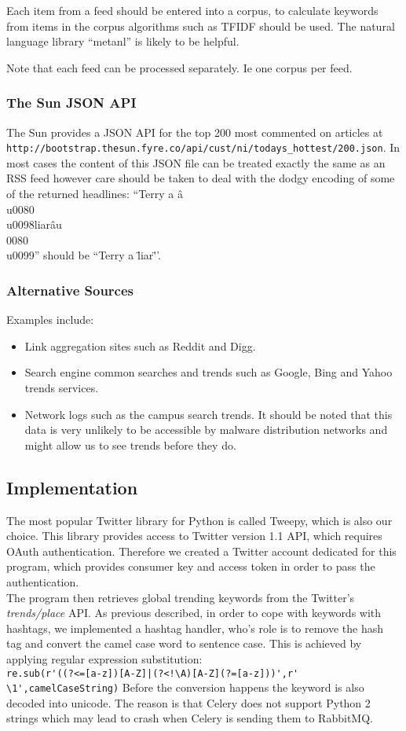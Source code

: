 Each item from a feed should be entered into a corpus, to calculate keywords from items in the corpus algorithms such as TFIDF should be used. The natural language library ``metanl'' is likely to be helpful.

Note that each feed can be processed separately. Ie one corpus per feed.

\subsubsection{The Sun JSON API}
The Sun provides a JSON API for the top 200 most commented on articles at \verb`http://bootstrap.thesun.fyre.co/api/cust/ni/todays_hottest/200.json`. In most cases the content of this JSON file can be treated exactly the same as an RSS feed however care should be taken to deal with the dodgy encoding of some of the returned headlines: ``Terry a â\\u0080\\u0098liarâu\\0080\\u0099'' should be ``Terry a \"liar\"''.

\subsubsection{Alternative Sources}
Examples include:
\begin{itemize}
    \item Link aggregation sites such as Reddit and Digg.
    \item Search engine common searches and trends such as Google, Bing and Yahoo trends services.
    \item Network logs such as the campus search trends. It should be noted that this data is very unlikely to be accessible by malware distribution networks and might allow us to see trends before they do.
\end{itemize}

\subsection{Implementation}
The most popular Twitter library for Python is called Tweepy, which is also 
our choice. This library provides access to Twitter version 1.1 API, which 
requires OAuth authentication. Therefore we created a Twitter account 
dedicated for this program, which provides consumer key and access token in 
order to pass the authentication. \\
The program then retrieves global trending keywords from the Twitter's {\em 
trends/place} API. As previous described, in order to cope with keywords with 
hashtags, we implemented a hashtag handler, who's role is to remove the hash 
tag and convert the camel case word to sentence case. This is achieved by 
applying regular expression substitution: \\
\newline
\verb`re.sub(r'((?<=[a-z])[A-Z]|(?<!\A)[A-Z](?=[a-z]))',r' \1',camelCaseString)`
\newline
Before the conversion happens the keyword is also decoded into unicode. The 
reason is that Celery does not support Python 2 strings which may lead to 
crash when Celery is sending them to RabbitMQ. 
